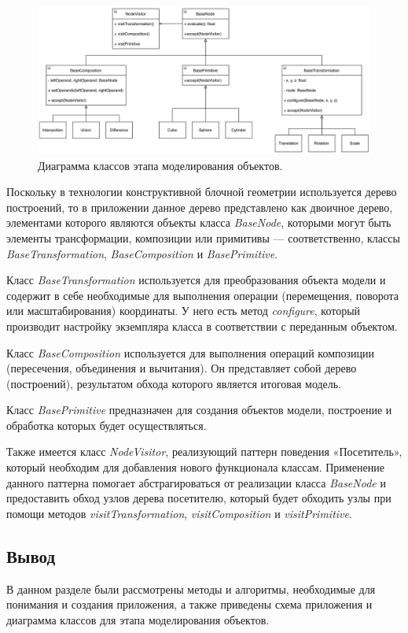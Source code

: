 \begin{figure}[h]
	\centering
	\includegraphics[width=160mm]{img/modeling.png}
	\caption{Диаграмма классов этапа моделирования объектов.}
	\label{fig:modeling}
\end{figure}
\clearpage

Поскольку  в  технологии  конструктивной  блочной  геометрии 
используется дерево построений, то в приложении данное дерево представлено 
как двоичное дерево, элементами которого являются объекты класса \textit{BaseNode}, которыми могут быть элементы трансформации, композиции или примитивы --- соответственно, классы \textit{BaseTransformation}, \textit{BaseComposition} и \textit{BasePrimitive}.

Класс  \textit{BaseTransformation} используется  для  преобразования  объекта 
модели  и  содержит  в  себе  необходимые  для  выполнения  операции 
(перемещения, поворота или масштабирования) координаты.
У него есть метод \textit{configure}, который производит настройку экземпляра класса в соответствии с переданным объектом.

Класс  \textit{BaseComposition} используется  для  выполнения  операций композиции (пересечения, объединения и вычитания).
Он представляет собой дерево (построений), результатом обхода которого является итоговая модель.

Класс  \textit{BasePrimitive}  предназначен  для  создания  объектов  модели, 
построение и обработка которых будет осуществляться.

Также  имеется  класс  \textit{NodeVisitor},  реализующий  паттерн  поведения 
«Посетитель», который необходим для добавления нового функционала классам.
Применение данного паттерна помогает абстрагироваться от реализации класса 
\textit{BaseNode} и  предоставить  обход  узлов  дерева  посетителю,  который  будет обходить  узлы  при  помощи  методов  \textit{visitTransformation}, \textit{visitComposition} и \textit{visitPrimitive}.

\subsection*{Вывод}

В данном разделе были рассмотрены методы и алгоритмы, необходимые 
для понимания и создания приложения, а также приведены схема приложения и 
диаграмма классов для этапа моделирования объектов.
\pagebreak